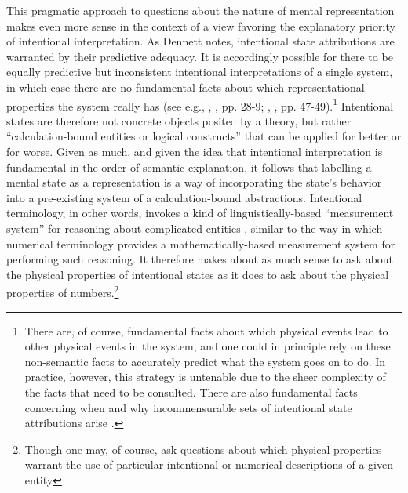 This pragmatic approach to questions about the nature of mental representation makes even more sense in the context of a view favoring the explanatory priority of intentional interpretation. As Dennett \citep{Dennett:1987,Dennett:1991} notes, intentional state attributions are warranted by their predictive adequacy. It is accordingly possible for there to be equally predictive but inconsistent intentional interpretations of a single system, in which case there are no fundamental facts about which representational properties the system really has (see e.g., \citeauthor{Dennett:1987}, \citeyear{Dennett:1987}, pp. 28-9; \citeauthor{Dennett:1991}, \citeyear{Dennett:1991}, pp. 47-49).\footnote{There are, of course, fundamental facts about which physical events lead to other physical events in the system, and one could in principle rely on these non-semantic facts to accurately predict what the system goes on to do. In practice, however, this strategy is untenable due to the sheer complexity of the facts that need to be consulted. There are also fundamental facts concerning when and why incommensurable sets of intentional state attributions arise \citep{Dennett:1987}.} Intentional states are therefore not concrete objects posited by a theory, but rather ``calculation-bound entities or logical constructs'' \citep[][p. 53]{Dennett:1987} that can be applied for better or for worse. Given as much, and given the idea that intentional interpretation is fundamental in the order of semantic explanation, it follows that labelling a mental state as a representation is a way of incorporating the state's behavior into a pre-existing system of a calculation-bound abstractions. Intentional terminology, in other words, invokes a kind of linguistically-based ``measurement system'' for reasoning about complicated entities \citep{Brandom:2010}, similar to the way in which numerical terminology provides a mathematically-based measurement system for performing such reasoning. It therefore makes about as much sense to ask about the physical properties of intentional states as it does to ask about the physical properties of numbers.\footnote{Though one may, of course, ask questions about which physical properties warrant the use of particular intentional or numerical descriptions of a given entity}

